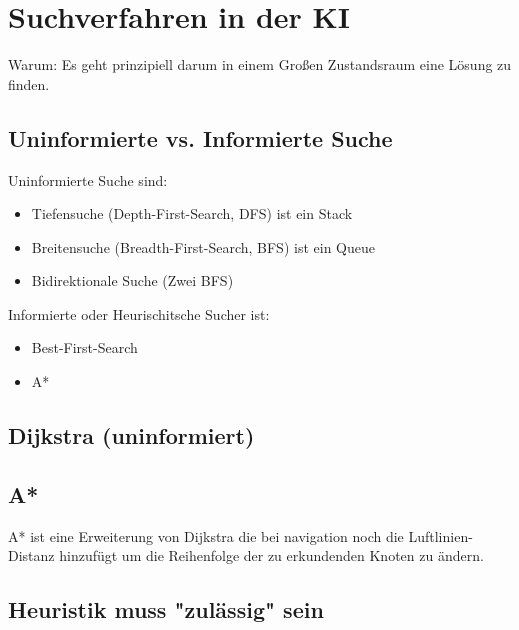 \documentclass[a4paper]{article}
\title{\docTitle}
\author{Moritz}
\date{\today}
\begin{document}
\maketitle
\tableofcontents


\section{Suchverfahren in der KI}

Warum: Es geht prinzipiell darum in einem Großen Zustandsraum eine Lösung zu finden.

\subsection{Uninformierte vs. Informierte Suche}

Uninformierte Suche sind:

\begin{itemize}
    \item Tiefensuche (Depth-First-Search, DFS) ist ein Stack
    \item Breitensuche (Breadth-First-Search, BFS) ist ein Queue
    \item Bidirektionale Suche (Zwei BFS)
\end{itemize}

Informierte oder Heurischitsche Sucher ist:

\begin{itemize}
    \item Best-First-Search
    \item A*
\end{itemize}

\subsection{Dijkstra (uninformiert)}



\subsection{A*}

A* ist eine Erweiterung von Dijkstra die bei navigation noch die Luftlinien-Distanz hinzufügt um die Reihenfolge der zu erkundenden Knoten zu ändern.

\subsection{Heuristik muss "zulässig" sein}
\end{document}
